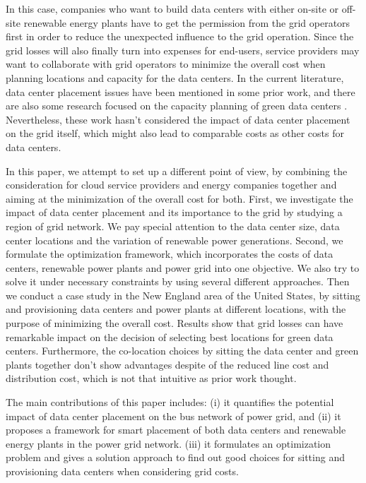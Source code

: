 In this case, companies who want to build data centers with either on-site or off-site renewable energy plants have to get the permission from the grid operators first in order to reduce the unexpected influence to the grid operation. Since the grid losses will also finally turn into expenses for end-users, service providers may want to collaborate with grid operators to minimize the overall cost when planning locations and capacity for the data centers. In the current literature, data center placement issues have been mentioned in some prior work\cite{Goiri11place,Dalger05,Boley09,larumbe2012optimal}, and there are also some research focused on the capacity planning of green data centers \cite{Le10,berral2014building}. Nevertheless, these work hasn't considered the impact of data center placement on the grid itself, which might also lead to comparable costs as other costs for data centers.

In this paper, we attempt to set up a different point of view, by combining the consideration for cloud service providers and energy companies together and aiming at the minimization of the overall cost for both. First, we investigate the impact of data center placement and its importance to the grid by studying a region of grid network. We pay special attention to the data center size, data center locations and the variation of renewable power generations. Second, we formulate the optimization framework, which incorporates the costs of data centers, renewable power plants and power grid into one objective. We also try to solve it under necessary constraints by using several different approaches. Then we conduct a case study in the New England area of the United States, by sitting and provisioning data centers and power plants at different locations, with the purpose of minimizing the overall cost. Results show that grid losses can have remarkable impact on the decision of selecting best locations for green data centers. Furthermore, the co-location choices by sitting the data center and green plants together don't show advantages despite of the reduced line cost and distribution cost, which is not that intuitive as prior work thought.

 The main contributions of this paper includes: (i) it quantifies the potential impact of data center placement on the bus network of power grid, and (ii) it proposes a framework for smart placement of both data centers and renewable energy plants in the power grid network. (iii) it formulates an optimization problem and gives a solution approach to find out good choices for sitting and provisioning data centers when considering grid costs.

